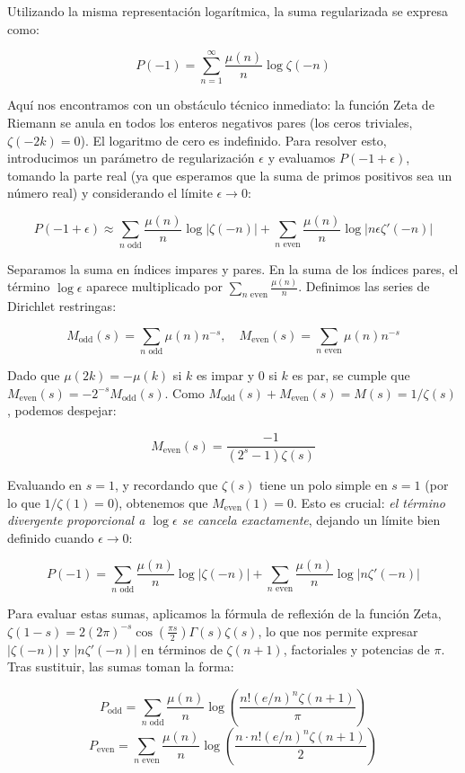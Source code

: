 Utilizando la misma representación logarítmica, la suma regularizada se expresa como:

$$ P(-1) = \sum_{n=1}^{\infty} \frac{\mu(n)}{n} \log \zeta(-n) $$

Aquí nos encontramos con un obstáculo técnico inmediato: la función Zeta de Riemann se anula en todos los enteros negativos pares (los ceros triviales, $\zeta(-2k) = 0$). El logaritmo de cero es indefinido. Para resolver esto, introducimos un parámetro de regularización $\epsilon$ y evaluamos $P(-1+\epsilon)$, tomando la parte real (ya que esperamos que la suma de primos positivos sea un número real) y considerando el límite $\epsilon \to 0$:

$$ P(-1+\epsilon) \approx \sum_{n \text{ odd}} \frac{\mu(n)}{n} \log |\zeta(-n)| + \sum_{n \text{ even}} \frac{\mu(n)}{n} \log |n\epsilon \zeta'(-n)| $$

Separamos la suma en índices impares y pares. En la suma de los índices pares, el término $\log \epsilon$ aparece multiplicado por $\sum_{n \text{ even}} \frac{\mu(n)}{n}$. Definimos las series de Dirichlet restringas:

$$ M_{\text{odd}}(s) = \sum_{n \text{ odd}} \mu(n) n^{-s}, \quad M_{\text{even}}(s) = \sum_{n \text{ even}} \mu(n) n^{-s} $$

Dado que $\mu(2k) = -\mu(k)$ si $k$ es impar y $0$ si $k$ es par, se cumple que $M_{\text{even}}(s) = -2^{-s} M_{\text{odd}}(s)$. Como $M_{\text{odd}}(s) + M_{\text{even}}(s) = M(s) = 1/\zeta(s)$, podemos despejar:

$$ M_{\text{even}}(s) = \frac{-1}{(2^s - 1)\zeta(s)} $$

Evaluando en $s=1$, y recordando que $\zeta(s)$ tiene un polo simple en $s=1$ (por lo que $1/\zeta(1) = 0$), obtenemos que $M_{\text{even}}(1) = 0$. Esto es crucial: \textit{el término divergente proporcional a $\log \epsilon$ se cancela exactamente}, dejando un límite bien definido cuando $\epsilon \to 0$:

$$ P(-1) = \sum_{n \text{ odd}} \frac{\mu(n)}{n} \log |\zeta(-n)| + \sum_{n \text{ even}} \frac{\mu(n)}{n} \log |n\zeta'(-n)| $$

Para evaluar estas sumas, aplicamos la fórmula de reflexión de la función Zeta, $\zeta(1-s) = 2(2\pi)^{-s} \cos(\frac{\pi s}{2}) \Gamma(s) \zeta(s)$, lo que nos permite expresar $|\zeta(-n)|$ y $|n\zeta'(-n)|$ en términos de $\zeta(n+1)$, factoriales y potencias de $\pi$. Tras sustituir, las sumas toman la forma:

$$ P_{\text{odd}} = \sum_{n \text{ odd}} \frac{\mu(n)}{n} \log \left( \frac{n! (e/n)^n \zeta(n+1)}{\pi} \right) $$
$$ P_{\text{even}} = \sum_{n \text{ even}} \frac{\mu(n)}{n} \log \left( \frac{n \cdot n! (e/n)^n \zeta(n+1)}{2} \right) $$

